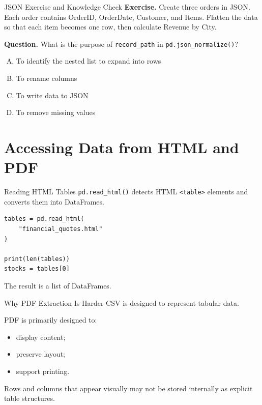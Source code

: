 \documentclass[aspectratio=169,11pt]{beamer}
\newcommand{\code}[1]{\texttt{#1}}
\newcommand{\smallgap}{\vspace{0.4em}}
\begin{document}
\begin{frame}{JSON Exercise and Knowledge Check}
\textbf{Exercise.} Create three orders in JSON. Each order contains OrderID, OrderDate, Customer, and Items. Flatten the data so that each item becomes one row, then calculate Revenue by City.

\smallgap
\textbf{Question.} What is the purpose of \code{record\_path} in \code{pd.json\_normalize()}?
\begin{enumerate}[A.]
  \item To identify the nested list to expand into rows
  \item To rename columns
  \item To write data to JSON
  \item To remove missing values
\end{enumerate}
\end{frame}

\section{Accessing Data from HTML and PDF}

\begin{frame}[fragile]{Reading HTML Tables}
\code{pd.read\_html()} detects HTML \code{<table>} elements and converts them into DataFrames.

\begin{lstlisting}[style=pythonstyle]
tables = pd.read_html(
    "financial_quotes.html"
)

print(len(tables))
stocks = tables[0]
\end{lstlisting}

The result is a list of DataFrames.
\end{frame}

\begin{frame}{Why PDF Extraction Is Harder}
CSV is designed to represent tabular data.

PDF is primarily designed to:
\begin{itemize}
  \item display content;
  \item preserve layout;
  \item support printing.
\end{itemize}

Rows and columns that appear visually may not be stored internally as explicit table structures.
\end{frame}
\end{document}
